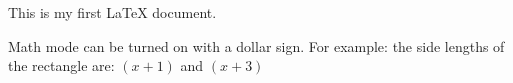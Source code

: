 \documentclass[11]{article}
\begin{document}
This is my first LaTeX document.

Math mode can be turned on with a dollar sign. For example: the side lengths of the rectangle are: $(x+1)$ and $(x+3)$
\end{document}
